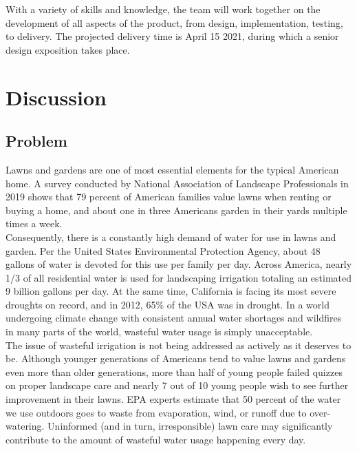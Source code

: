 \documentclass[]{article}
\begin{document}
With a variety of skills and knowledge, the team will work together on the development of all aspects of the product, from design, implementation, testing, to delivery. The projected delivery time is April 15 2021, during which a senior design exposition takes place.


\section*{Discussion}
\subsection*{Problem}
Lawns and gardens are one of most essential elements for the typical American home. A survey conducted by National Association of Landscape Professionals in 2019 shows that 79 percent of American families value lawns when renting or buying a home, and about one in three Americans garden in their yards multiple times a week\cite{noauthor_new_2019}. \\

Consequently, there is a constantly high demand of water for use in lawns and garden. Per the United States Environmental Protection Agency, about 48 gallons of water is devoted for this use per family per day. Across America, nearly 1/3 of all residential water is used for landscaping irrigation totaling an estimated 9 billion gallons per day\cite{epa_outdoor_nodate}. At the same time, California is facing its most severe droughts on record, and in 2012, 65\% of the USA was in drought\cite{epa_drought_nodate}. In a world undergoing climate change with consistent annual water shortages and wildfires in many parts of the world, wasteful water usage is simply unacceptable. \\

The issue of wasteful irrigation is not being addressed as actively as it deserves to be. Although younger generations of Americans tend to value lawns and gardens even more than older generations, more than half of young people failed quizzes on proper landscape care and nearly 7 out of 10 young people wish to see further improvement in their lawns\cite{noauthor_new_2016}. EPA experts estimate that 50 percent of the water we use outdoors goes to waste from evaporation, wind, or runoff due to over-watering\cite{epa_watersense_nodate}. Uninformed (and in turn, irresponsible) lawn care may significantly contribute to the amount of wasteful water usage happening every day.\\
\end{document}
